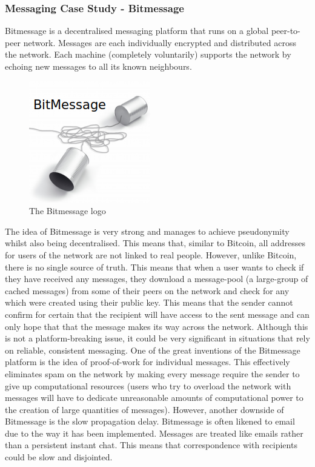 \documentclass{article}
\begin{document}
\subsubsection{Messaging Case Study - Bitmessage}
Bitmessage\cite{bitmessage_paper} is a decentralised messaging platform that runs on a global peer-to-peer network. Messages are each individually encrypted and distributed across the network. Each machine (completely voluntarily) supports the network by echoing new messages to all its known neighbours.
\begin{figure}[h]
    \centering
    \includegraphics[width=0.4\linewidth]{Images/bitmessagelogo}
    \caption{The Bitmessage logo}
    \label{fig:bitmessagelogo}
\end{figure}
The idea of Bitmessage is very strong and manages to achieve pseudonymity whilst also being decentralised. This means that, similar to Bitcoin, all addresses for users of the network are not linked to real people. However, unlike Bitcoin, there is no single source of truth. This means that when a user wants to check if they have received any messages, they download a message-pool (a large-group of cached messages) from some of their peers on the network and check for any which were created using their public key. This means that the sender cannot confirm for certain that the recipient will have access to the sent message and can only hope that that the message makes its way across the network. Although this is not a platform-breaking issue, it could be very significant in situations that rely on reliable, consistent messaging.
One of the great inventions of the Bitmessage platform is the idea of proof-of-work for individual messages. This effectively eliminates spam on the network by making every message require the sender to give up computational resources (users who try to overload the network with messages will have to dedicate unreasonable amounts of computational power to the creation of large quantities of messages).
However, another downside of Bitmessage is the slow propagation delay. Bitmessage is often likened to email due to the way it has been implemented. Messages are treated like emails rather than a persistent instant chat. This means that correspondence with recipients could be slow and disjointed.
\end{document}
